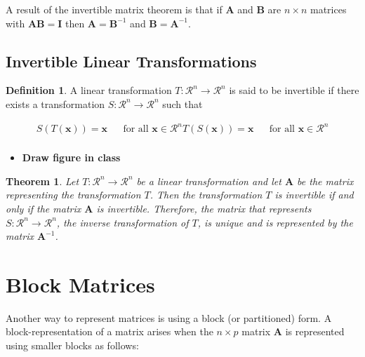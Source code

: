 \documentclass[
]{book}
\providecommand{\tightlist}{%
  \setlength{\itemsep}{0pt}\setlength{\parskip}{0pt}}
\newtheorem{theorem}{Theorem}[chapter]
\theoremstyle{definition}
\newtheorem{definition}{Definition}[chapter]
\theoremstyle{definition}
\theoremstyle{definition}
\theoremstyle{remark}
\begin{document}
A result of the invertible matrix theorem is that if \(\mathbf{A}\) and \(\mathbf{B}\) are \(n \times n\) matrices with \(\mathbf{A} \mathbf{B} = \mathbf{I}\) then \(\mathbf{A} = \mathbf{B}^{-1}\) and \(\mathbf{B} = \mathbf{A}^{-1}\).

\hypertarget{invertible-linear-transformations}{%
\section{Invertible Linear Transformations}\label{invertible-linear-transformations}}

\begin{definition}
\protect\hypertarget{def:unnamed-chunk-147}{}{\label{def:unnamed-chunk-147} }A linear transformation \(T:\mathcal{R}^n \rightarrow \mathcal{R}^n\) is said to be invertible if there exists a transformation \(S:\mathcal{R}^n \rightarrow \mathcal{R}^n\) such that

\[
\begin{aligned}
S(T(\mathbf{x})) = \mathbf{x} && \mbox{for all } \mathbf{x} \in \mathcal{R}^n
T(S(\mathbf{x})) = \mathbf{x} && \mbox{for all } \mathbf{x} \in \mathcal{R}^n \\
\end{aligned}
\]
\end{definition}

\begin{itemize}
\tightlist
\item
  \textbf{Draw figure in class}
\end{itemize}

\begin{theorem}
\protect\hypertarget{thm:unnamed-chunk-148}{}{\label{thm:unnamed-chunk-148} }Let \(T:\mathcal{R}^n \rightarrow \mathcal{R}^n\) be a linear transformation and let \(\mathbf{A}\) be the matrix representing the transformation \(T\). Then the transformation \(T\) is invertible if and only if the matrix \(\mathbf{A}\) is invertible. Therefore, the matrix that represents \(S:\mathcal{R}^n \rightarrow \mathcal{R}^n\), the inverse transformation of \(T\), is unique and is represented by the matrix \(\mathbf{A}^{-1}\).
\end{theorem}

\hypertarget{block-matrices}{%
\chapter{Block Matrices}\label{block-matrices}}

Another way to represent matrices is using a block (or partitioned) form. A block-representation of a matrix arises when the \(n \times p\) matrix \(\mathbf{A}\) is represented using smaller blocks as follows:
\end{document}
